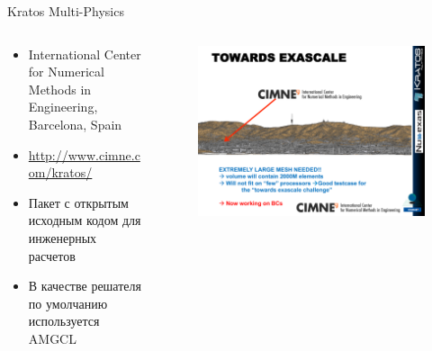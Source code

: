 \documentclass[@BEAMER_OPTIONS@]{beamer}
\newcommand{\www}[1]{\href{#1}{#1}}
\begin{document}
\begin{frame}{Kratos Multi-Physics}
    \begin{columns}
        \begin{column}{0.45\textwidth}
            \begin{itemize}
                \item International Center for Numerical Methods in
                    Engineering, Barcelona, Spain
                \item \www{http://www.cimne.com/kratos/}
                \item Пакет с открытым исходным кодом для инженерных расчетов
                \item В качестве решателя по умолчанию используется AMGCL
            \end{itemize}
        \end{column}
        \begin{column}{0.55\textwidth}
            \begin{figure}
                \includegraphics[width=\textwidth]{kratos}
            \end{figure}
        \end{column}
    \end{columns}
\end{frame}
\end{document}
